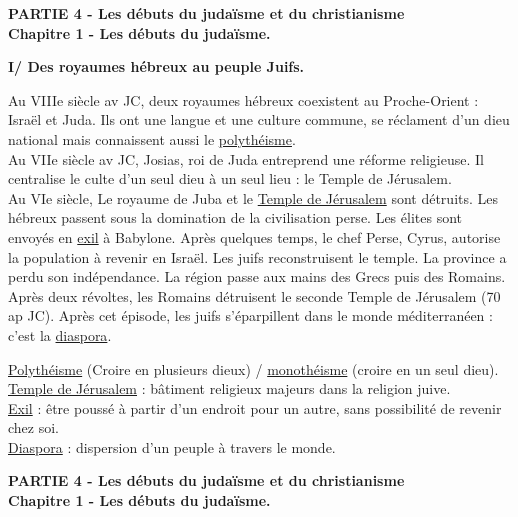\documentclass[12pt]{article}
\begin{document}
\begin{center}
\textbf{{\large PARTIE 4 - Les débuts du judaïsme et du christianisme }\\ {\large Chapitre 1 - Les débuts du judaïsme. }}
\end{center}

\textbf{I/ Des royaumes hébreux au peuple Juifs.}

\vspace{0.5cm}
\setlength{\parindent}{1cm} Au VIIIe siècle av JC, deux royaumes hébreux coexistent au Proche-Orient : Israël et Juda. Ils ont une langue et une culture commune, se réclament d'un dieu national mais connaissent aussi le \underline{polythéisme}.\\

\setlength{\parindent}{1cm}Au VIIe siècle av JC, Josias, roi de Juda entreprend une réforme religieuse. Il centralise le culte d'un seul dieu à un seul lieu : le Temple de Jérusalem.\\

\setlength{\parindent}{1cm}Au VIe siècle, Le royaume de Juba et le \underline{Temple de Jérusalem} sont détruits. Les hébreux passent sous la domination de la civilisation perse. Les élites sont envoyés en \underline{exil} à Babylone. Après quelques temps, le chef Perse, Cyrus, autorise la population à revenir en Israël. Les juifs reconstruisent le temple. La province a perdu son indépendance. La région passe aux mains des Grecs puis des Romains. Après deux révoltes, les Romains détruisent le seconde Temple de Jérusalem (70 ap JC). Après cet épisode, les juifs s'éparpillent dans le monde méditerranéen : c'est la \underline{diaspora}.

\vspace{0.5cm}

\underline{Polythéisme} (Croire en plusieurs dieux) / \underline{monothéisme} (croire en un seul dieu).\\
\underline{Temple de Jérusalem} : bâtiment religieux majeurs dans la religion juive.\\
\underline{Exil} : être poussé à partir d'un endroit pour un autre, sans possibilité de revenir chez soi.\\
\underline{Diaspora} : dispersion d'un peuple à travers le monde.

\vfill

\begin{center}
\textbf{{\large PARTIE 4 - Les débuts du judaïsme et du christianisme }\\ {\large Chapitre 1 - Les débuts du judaïsme. }}
\end{center}
\end{document}
